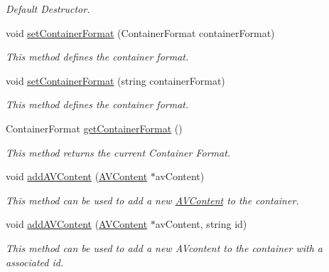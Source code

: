 \begin{DoxyCompactItemize}
\begin{DoxyCompactList}\small\item\em Default Destructor. \item\end{DoxyCompactList}\item 
void \hyperlink{classbr_1_1ufscar_1_1lince_1_1xpta_1_1streaming_1_1AVContainer_abae4430b7bbbcbc2cd33d142368e7970}{setContainerFormat} (ContainerFormat containerFormat)
\begin{DoxyCompactList}\small\item\em This method defines the container format. \item\end{DoxyCompactList}\item 
void \hyperlink{classbr_1_1ufscar_1_1lince_1_1xpta_1_1streaming_1_1AVContainer_a5afa272e28654c1ec17bfd0746cd67ce}{setContainerFormat} (string containerFormat)
\begin{DoxyCompactList}\small\item\em This method defines the container format. \item\end{DoxyCompactList}\item 
ContainerFormat \hyperlink{classbr_1_1ufscar_1_1lince_1_1xpta_1_1streaming_1_1AVContainer_a4f2e2e221bb4158cd0a4cf28701a3beb}{getContainerFormat} ()
\begin{DoxyCompactList}\small\item\em This method returns the current Container Format. \item\end{DoxyCompactList}\item 
void \hyperlink{classbr_1_1ufscar_1_1lince_1_1xpta_1_1streaming_1_1AVContainer_a4ffc0e43e1048694cae3b30e292c3925}{addAVContent} (\hyperlink{classbr_1_1ufscar_1_1lince_1_1xpta_1_1streaming_1_1AVContent}{AVContent} $\ast$avContent)
\begin{DoxyCompactList}\small\item\em This method can be used to add a new \hyperlink{classbr_1_1ufscar_1_1lince_1_1xpta_1_1streaming_1_1AVContent}{AVContent} to the container. \item\end{DoxyCompactList}\item 
void \hyperlink{classbr_1_1ufscar_1_1lince_1_1xpta_1_1streaming_1_1AVContainer_afb51ab7d4a485477e377f3d309a3033f}{addAVContent} (\hyperlink{classbr_1_1ufscar_1_1lince_1_1xpta_1_1streaming_1_1AVContent}{AVContent} $\ast$avContent, string id)
\begin{DoxyCompactList}\small\item\em This method can be used to add a new AVcontent to the container with a associated id. \item\end{DoxyCompactList}\item 

\end{DoxyCompactItemize}
